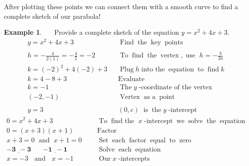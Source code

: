 \documentclass[12pt]{book}
\theoremstyle{definition}
\newtheorem{example}{Example}
\newcommand{\tmmathbf}[1]{\ensuremath{\boldsymbol{#1}}}
\newcommand{\tmop}[1]{\ensuremath{\operatorname{#1}}}
\begin{document}
After plotting these points we can connect them with a smooth curve to find a complete sketch of our parabola!
\begin{example}~~~Provide a complete sketch of the equation $y = x^2 + 4 x + 3$.
  \begin{eqnarray*}
    y = x^2 + 4 x + 3 &  & \tmop{Find} \tmop{the} \tmop{key} \tmop{points}\\
    &  & \\
    h = -\frac{4}{2 (1)} = -\frac{4}{2} = - 2 &  & \tmop{To} \tmop{find}
    \tmop{the} \tmop{vertex}, \tmop{use~} h = -\frac{b}{2 a}\\
    k = (- 2)^2 + 4 (- 2) + 3 &  & \tmop{Plug} h \tmop{into~the} \tmop{equation} \tmop{to} \tmop{find} k\\
    k = 4 - 8 + 3 &  & \tmop{Evaluate}\\
    k = - 1 &  & \tmop{The} y \tmop{-coordinate~of~the~vertex}\\
    (- 2, - 1) &  & \tmop{Vertex} \tmop{as~a} \tmop{point}\\
    &  & \\
		y = 3 &  & (0,c) \tmop{~is} \tmop{the} y \tmop{-intercept}
\end{eqnarray*}
\begin{eqnarray*}
    0 = x^2 + 4 x + 3 &  & \tmop{To} \tmop{find~the~} x \tmop{-intercept}
    \tmop{we} \tmop{solve} \tmop{the} \tmop{equation}\\
    0 = (x + 3) (x + 1) &  & \tmop{Factor}\\
    x + 3 = 0 \tmop{~and~} x + 1 = 0~~~ &  & \tmop{Set} \tmop{each} \tmop{factor}
    \tmop{equal} \tmop{to} \tmop{zero}\\
    \tmmathbf{\underline{- 3 ~~- 3} ~~~~~~~~ \underline{- 1 ~~- 1}} &  & \tmop{Solve} \tmop{each}
    \tmop{equation}\\
    x = - 3 \tmop{~~and~~} x = - 1~ &  & \tmop{Our} x\tmop{-intercepts}%
 \end{eqnarray*}
\end{example}
\end{document}
